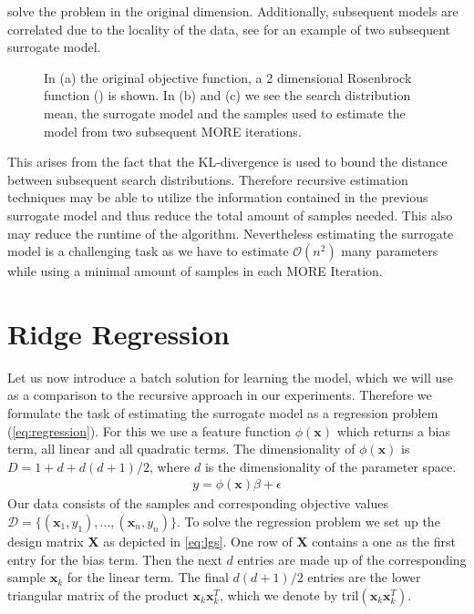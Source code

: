 solve the problem in the original dimension.
Additionally, subsequent models are correlated
due to the locality of the data, see  for an example of
two subsequent surrogate model.
\begin{figure}[t]
  \centering
  \caption{\small
    In (a) the original objective function,
    a 2 dimensional Rosenbrock function () is shown.
    In (b) and (c) we see the search distribution mean,
    the surrogate model and the samples used to estimate
    the model from two subsequent MORE iterations.}
 \label{fig:sur_model}
\end{figure}
This arises from the fact that the KL-divergence is
used to bound the distance between
subsequent search distributions. Therefore recursive estimation
techniques may be able to utilize the information contained in the previous
surrogate model and thus reduce the total amount of samples needed.
This also may reduce the runtime of the algorithm.
Nevertheless estimating the surrogate model is a challenging task as we
have to estimate $\mathcal{O}(n^2)$ many parameters while using a minimal
amount of samples in each MORE Iteration. 


\section{Ridge Regression}
\label{sec:ridge}
Let us now introduce a batch solution for learning the model,
which we will use as a comparison
to the recursive approach in our experiments.
Therefore we formulate the task of estimating the surrogate model as
a regression problem (\ref{eq:regression}). For this we use
a feature function $\phi(\mathbf{x})$ which returns
a bias term, all linear and all quadratic terms. The dimensionality of
$\phi(\mathbf{x})$ is $D = 1 + d + d(d + 1) / 2$, where $d$
is the dimensionality of the parameter space.
\begin{align}
  \label{eq:regression}
  y = \phi(\mathbf{x}) \beta + \epsilon
\end{align}
Our data consists of the samples and corresponding objective
values $\mathcal{D} = \{(\mathbf{x}_1, y_1),\dots,(\mathbf{x}_n, y_n)\}$.
To solve the regression problem we set up
the design matrix $\mathbf{X}$ as depicted in \cref{eq:lgs}.
One row of $\mathbf{X}$ contains a one as the first entry for the bias term.
Then the next $d$ entries are made up of the corresponding
sample $\mathbf{x}_k$ for the linear term.
The final $d(d + 1) / 2$  entries are
the lower triangular matrix of the product $\mathbf{x}_k \mathbf{x}_k^T$,
which we denote by tril$(\mathbf{x}_k \mathbf{x}_k^T)$.

